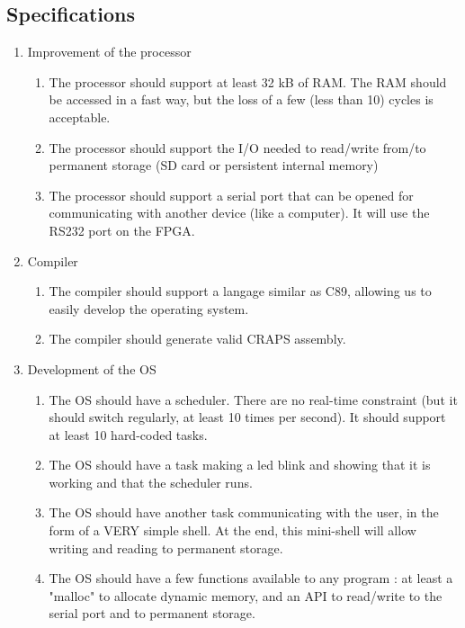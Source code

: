 \documentclass{article}
\begin{document}
  \newpage
  \begin{appendix}
      \section{Specifications}

      \begin{enumerate}
        \item Improvement of the processor
          \begin{enumerate}
            \item The processor should support at least 32 kB of RAM. The RAM should be accessed in a fast way, but the loss of a few (less than 10) cycles is acceptable.
            \item The processor should support the I/O needed to read/write from/to permanent storage (SD card or persistent internal memory)
            \item The processor should support a serial port that can be opened for communicating with another device (like a computer). It will use the RS232 port on the FPGA.
          \end{enumerate}
        \item Compiler
          \begin{enumerate}
            \item The compiler should support a langage similar as C89, allowing us to easily develop the operating system.
            \item The compiler should generate valid CRAPS assembly.
          \end{enumerate}
        \item Development of the OS
          \begin{enumerate}
            \item The OS should have a scheduler. There are no real-time constraint (but it should switch regularly, at least 10 times per second). It should support at least 10 hard-coded tasks.
            \item The OS should have a task making a led blink and showing that it is working and that the scheduler runs.
            \item The OS should have another task communicating with the user, in the form of a VERY simple shell. At the end, this mini-shell will allow writing and reading to permanent storage.
            \item The OS should have a few functions available to any program : at least a "malloc" to allocate dynamic memory, and an API to read/write to the serial port and to permanent storage.
          \end{enumerate}
      \end{enumerate}


\end{appendix}
\end{document}
